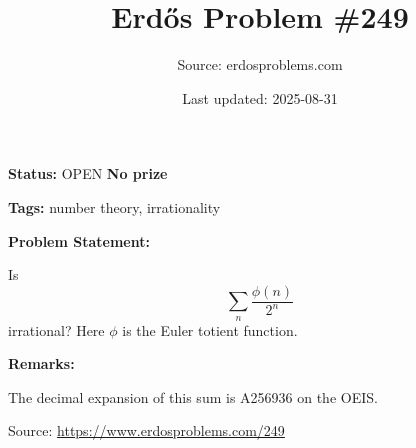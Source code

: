 \documentclass{article}
\title{Erd\H{o}s Problem \#249}
\date{Last updated: 2025-08-31}
\author{Source: erdosproblems.com}
\begin{document}
\maketitle

\noindent\textbf{Status:} OPEN \quad \textbf{No prize}

\noindent\textbf{Tags:} number theory, irrationality

\medskip
\noindent\textbf{Problem Statement:}

Is\[\sum_n \frac{\phi(n)}{2^n}\]irrational? Here $\phi$ is the Euler totient function.

\bigskip
\noindent\textbf{Remarks:}

The decimal expansion of this sum is A256936 on the OEIS.

\bigskip
\noindent\small{Source: \url{https://www.erdosproblems.com/249}}
\end{document}
